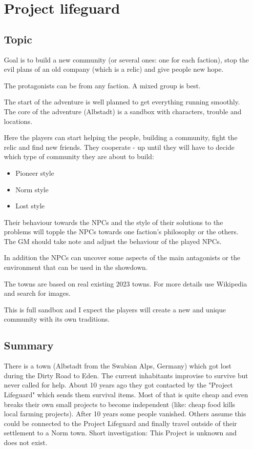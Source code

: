 \chapter{Project lifeguard}
\label{ch:project lifeguard}

\section{Topic}

Goal is to build a new community (or several ones: one for each faction), stop the evil plans of an old company (which is a relic) and give people new hope.

The protagonists can be from any faction. A mixed group is best.

The start of the adventure is well planned to get everything running smoothly. The core of the adventure (Albstadt) is a sandbox with characters, trouble and locations.

Here the players can start helping the people, building a community, fight the relic and find new friends. They cooperate - up until they will have to decide which type of community they are about to build:

\begin{itemize}
    \item Pioneer style
    \item Norm style
    \item Lost style
\end{itemize}

Their behaviour towards the NPCs and the style of their solutions to the problems will topple the NPCs towards one faction's philosophy or the others. The GM should take note and adjust the behaviour of the played NPCs.

In addition the NPCs can uncover some aspects of the main antagonists or the environment that can be used in the showdown.

The towns are based on real existing 2023 towns. For more details use Wikipedia and search for images.

This is full sandbox and I expect the players will create a new and unique community with its own traditions.

\section{Summary}

There is a town (Albstadt from the Swabian Alps, Germany) which got lost during the Dirty Road to Eden. The current inhabitants improvise to survive but never called for help. About 10 years ago they got contacted by the "Project Lifeguard" which sends them survival items. Most of that is quite cheap and even breaks their own small projects to become independent (like: cheap food kills local farming projects). After 10 years some people vanished. Others assume this could be connected to the Project Lifeguard and finally travel outside of their settlement to a Norm town. Short investigation: This Project is unknown and does not exist.

